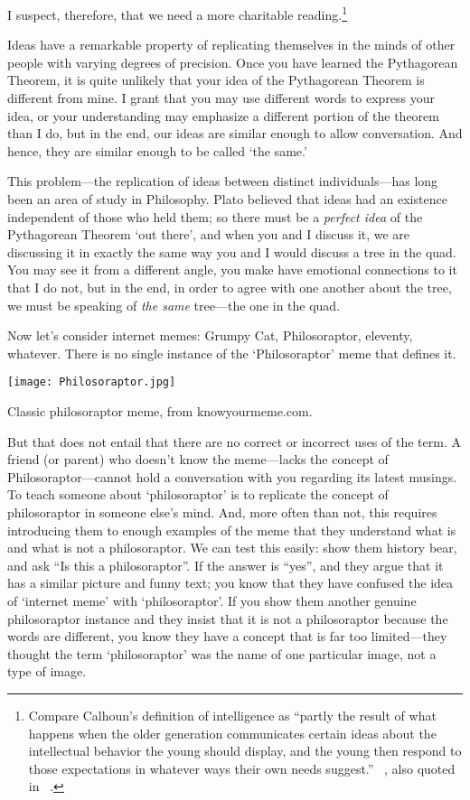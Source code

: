 I suspect, therefore, that we need a more charitable reading.\footnote{Compare Calhoun's definition of intelligence as ``partly the result of what happens when the older generation communicates certain ideas about the intellectual behavior the young should display, and the young then respond to those expectations in whatever ways their own needs suggest.'' ~\citep[p. ix]{Calhoun:1973th}, also quoted in ~\citep[p. 212]{Rose:2005wi}.} 

Ideas have a remarkable property of replicating themselves in the minds of other people with varying degrees of precision. Once you have learned the Pythagorean Theorem, it is quite unlikely that your idea of the Pythagorean Theorem is different from mine. I grant that you may use different words to express your idea, or your understanding may emphasize a different portion of the theorem than I do, but in the end, our ideas are similar enough to allow conversation. And hence, they are similar enough to be called `the same.'

This problem---the replication of ideas between distinct individuals---has long been an area of study in Philosophy. Plato believed that ideas had an existence independent of those who held them; so there must be a \emph{perfect idea} of the Pythagorean Theorem `out there', and when you and I discuss it, we are discussing it in exactly the same way you and I would discuss a tree in the quad. You may see it from a different angle, you make have emotional connections to it that I do not, but in the end, in order to agree with one another about the tree, we must be speaking of \emph{the same} tree---the one in the quad. 

Now let's consider internet memes: Grumpy Cat, Philosoraptor, eleventy, whatever. There is no single instance of the `Philosoraptor' meme that defines it. \begin{marginfigure}\texttt{[image: Philosoraptor.jpg]}\caption{Classic philosoraptor meme, from knowyourmeme.com.}\label{fig:socrates}\end{marginfigure}

But that does not entail that there are no correct or incorrect uses of the term. A friend (or parent) who doesn't know the meme---lacks the concept of Philosoraptor---cannot hold a conversation with you regarding its latest musings. To teach someone about `philosoraptor' is to replicate the concept of philosoraptor in someone else's mind. And, more often than not, this requires introducing them to enough examples of the meme that they understand what is and what is not a philosoraptor. We can test this easily: show them history bear, and ask ``Is this a philosoraptor''. If the answer is ``yes'', and they argue that it has a similar picture and funny text; you know that they have confused the idea of `internet meme' with `philosoraptor'. If you show them another genuine philosoraptor instance and they insist that it is not a philosoraptor because the words are different, you know they have a concept that is far too limited---they thought the term `philosoraptor' was the name of one particular image, not a type of image.


